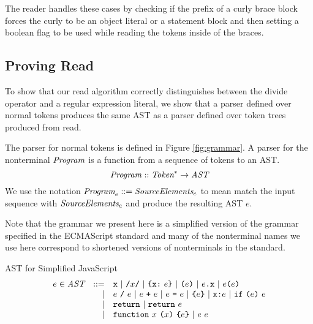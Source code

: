 \documentclass[preprint,10pt]{sigplanconf}
\begin{document}
The reader handles these cases by checking if the prefix of a curly
brace block forces the curly to be an object literal or a statement
block and then setting a boolean flag to be used while reading the
tokens inside of the braces.

\subsection{Proving Read}

To show that our read algorithm correctly distinguishes between the
divide operator and a regular expression literal, we show that
a parser defined over normal tokens produces the same AST as a parser
defined over token trees produced from read.

The parser for normal tokens is defined in Figure \ref{fig:grammar}. A
parser for the nonterminal \( \textit{Program}_{} \) is a function from a
sequence of tokens to an AST.
\[
\textit{Program}_{} :: \textit{Token}^* \rightarrow \textit{AST}
\]
We use the notation $\textit{Program}_{e} ::= \textit{SourceElements}_{e}$
to mean match the input sequence with $\textit{SourceElements}_{e}$ and
produce the resulting AST $e$.

Note that the grammar we present here is a simplified version of the
grammar specified in the ECMAScript standard \cite{International2011}
and many of the nonterminal names we use here correspond to shortened
versions of nonterminals in the standard.


\begin{displayfigure}{\label{fig:ast}AST for Simplified JavaScript}
\[
\begin{array}{rrl}
  e \in \textit{AST} &::=& \texttt{x} ~|~ \texttt{/}x\texttt{/} ~|~ \texttt{\{}\texttt{x}\texttt{:}~e\texttt{\}} ~|~ \texttt{(}e\texttt{)}
  ~|~ e\texttt{.}\texttt{x} ~|~ e\texttt{(}e\texttt{)}
  \\
  &|& e~\texttt{/}~e ~|~ e ~\texttt{+}~ e ~|~ e ~\texttt{=}~ e
  ~|~ \texttt{\{}e\texttt{\}} ~|~ \texttt{x} \texttt{:} e ~|~ \texttt{if}~\texttt{(}e\texttt{)}~e
  \\ 
  &|& \texttt{return} ~|~ \texttt{return}~e
  \\
  &|& \texttt{function}~x~\texttt{(}x\texttt{)}~\texttt{\{}e\texttt{\}} ~|~ e~e
\end{array}
\]
\end{displayfigure}
\end{document}
